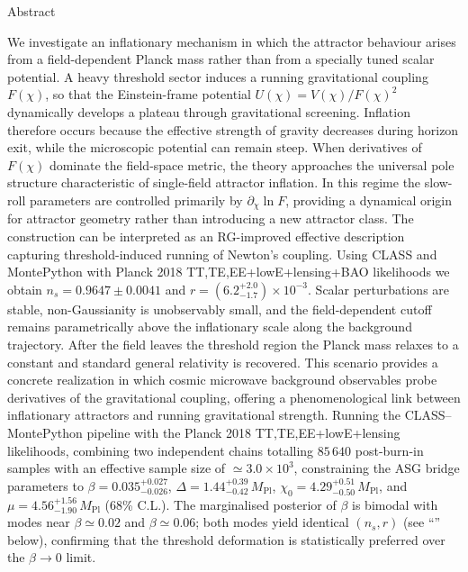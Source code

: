 \documentclass[
]{article}
\author{}
\date{}
\begin{document}
Abstract

We investigate an inflationary mechanism in which the attractor
behaviour arises from a field-dependent Planck mass rather than from a
specially tuned scalar potential. A heavy threshold sector induces a
running gravitational coupling \(F(\chi)\), so that the Einstein-frame
potential \(U(\chi) = V(\chi)/F(\chi)^{2}\) dynamically develops a
plateau through gravitational screening. Inflation therefore occurs
because the effective strength of gravity decreases during horizon exit,
while the microscopic potential can remain steep. When derivatives of
\(F(\chi)\) dominate the field-space metric, the theory approaches the
universal pole structure characteristic of single-field attractor inflation. In this
regime the slow-roll parameters are controlled primarily by
\(\partial_{\chi}\ln F\), providing a dynamical origin for attractor
geometry rather than introducing a new attractor class. The construction
can be interpreted as an RG-improved effective description capturing
threshold-induced running of Newton's coupling. Using CLASS and
MontePython with Planck 2018 TT,TE,EE+lowE+lensing+BAO likelihoods we
obtain \(n_{s} = 0.9647 \pm 0.0041\) and
\(r = ({6.2}_{- 1.7}^{+ 2.0}) \times 10^{- 3}\). Scalar perturbations
are stable, non-Gaussianity is unobservably small, and the
field-dependent cutoff remains parametrically above the inflationary scale along the
background trajectory. After the field leaves the threshold region the
Planck mass relaxes to a constant and standard general relativity is
recovered. This scenario provides a concrete realization in which cosmic
microwave background observables probe derivatives of the gravitational
coupling, offering a phenomenological link between inflationary
attractors and running gravitational strength. Running the
CLASS--MontePython pipeline with the Planck 2018 TT,TE,EE+lowE+lensing
likelihoods, combining two independent chains totalling \(85\,640\)
post-burn-in samples with an effective sample size of
\(\simeq 3.0\times 10^{3}\), constraining the ASG bridge parameters to
\(\beta = 0.035^{+0.027}_{-0.026}\),
\(\Delta = 1.44^{+0.39}_{-0.42}\,M_{\mathrm{Pl}}\),
\(\chi_{0} = 4.29^{+0.51}_{-0.50}\,M_{\mathrm{Pl}}\), and
\(\mu = 4.56^{+1.56}_{-1.90}\,M_{\mathrm{Pl}}\) (68\% C.L.). The
marginalised posterior of \(\beta\) is bimodal with modes near
\(\beta \simeq 0.02\) and \(\beta \simeq 0.06\); both modes yield
identical \((n_{s}, r)\) (see ``'' below), confirming
that the threshold deformation is statistically preferred over the
\(\beta \to 0\) limit.
\end{document}
